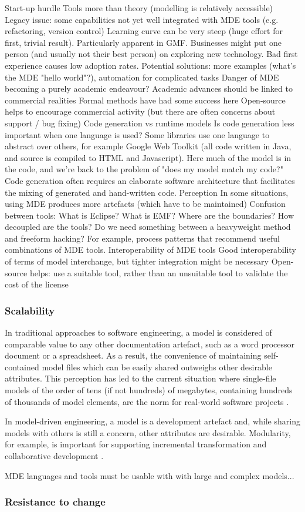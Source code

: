 Start-up hurdle
Tools more than theory (modelling is relatively accessible)
Legacy issue: some capabilities not yet well integrated with MDE tools (e.g. refactoring, version control)
Learning curve can be very steep (huge effort for first, trivial result). Particularly apparent in GMF.
Businesses might put one person (and usually not their best person) on exploring new technology.
Bad first experience causes low adoption rates.
Potential solutions: more examples (what's the MDE "hello world"?), automation for complicated tasks
Danger of MDE becoming a purely academic endeavour?
Academic advances should be linked to commercial realities
Formal methods have had some success here
Open-source helps to encourage commercial activity (but there are often concerns about support / bug fixing)
Code generation vs runtime models
Is code generation less important when one language is used? Some libraries use one language to abstract over others, for example Google Web Toolkit (all code written in Java, and source is compiled to HTML and Javascript).
Here much of the model is in the code, and we're back to the problem of "does my model match my code?"
Code generation often requires an elaborate software architecture that facilitates the mixing of generated and hand-written code.
Perception
In some situations, using MDE produces more artefacts (which have to be maintained)
Confusion between tools: What is Eclipse? What is EMF? Where are the boundaries? How decoupled are the tools?
Do we need something between a heavyweight method and freeform hacking? For example, process patterns that recommend useful combinations of MDE tools.
Interoperability of MDE tools
Good interoperability of terms of model interchange, but tighter integration might be necessary
Open-source helps: use a suitable tool, rather than an unsuitable tool to validate the cost of the license

\subsubsection{Scalability}
In traditional approaches to software engineering, a model is considered of comparable value to any other documentation artefact, such as a word processor document or a spreadsheet. As a result, the convenience of maintaining self-contained model files which can be easily shared outweighs other desirable attributes. This perception has led to the current situation where single-file models of the order of tens (if not hundreds) of megabytes, containing hundreds of thousands of model elements, are the norm for real-world software projects \cite{kolovos08scalability}.

In model-driven engineering, a model is a development artefact and, while sharing models with others is still a concern, other attributes are desirable. Modularity, for example, is important for supporting incremental transformation and collaborative development \cite{kolovos08scalability}.

MDE languages and tools must be usable with with large and complex models...


\subsubsection{Resistance to change}